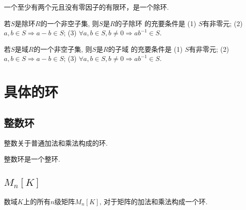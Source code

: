 \begin{Proposition}
一个至少有两个元且没有零因子的有限环，是一个除环.
\end{Proposition}

\begin{Theorem}
若$S$是除环$R$的一个非空子集, 则$S$是$R$的子除环 的充要条件是 (1) $S$有非零元; (2) $a, b \in S \Rightarrow a-b \in S$; (3) $\forall a, b \in S, b \neq 0 \Rightarrow ab^{-1} \in S$.
\end{Theorem}

\begin{Theorem}
若$S$是域$R$的一个非空子集, 则$S$是$R$的子域 的充要条件是 (1) $S$有非零元; (2) $a, b \in S \Rightarrow a-b \in S$; (3) $\forall a, b \in S, b \neq 0 \Rightarrow ab^{-1} \in S$.
\end{Theorem}



\section{具体的环}

\subsection{整数环} %

\begin{Definition}[整数环]
整数关于普通加法和乘法构成的环.
\end{Definition}

\begin{Proposition}
整数环是一个整环.
\end{Proposition}

\subsection{$M_n[K]$}

\begin{Note}
数域$K$上的所有$n$级矩阵$M_n[K]$, 对于矩阵的加法和乘法构成一个环.
\end{Note}